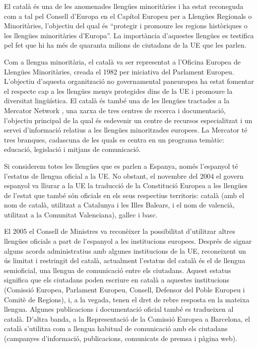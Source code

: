 \begin{multicols}{2}
El català és una de les anomenades llengües minoritàries i ha estat reconeguda com a tal pel Consell d’Europa en el Capítol Europeu per a Llengües Regionals o Minoritàries, l’objectiu del qual és “protegir i promoure les regions històriques o les llengües minoritàries d’Europa”. La importància d’aquestes llengües es testifica pel fet que hi ha més de quaranta milions de ciutadans de la UE que les parlen.

Com a llengua minoritària, el català va ser representat a l’Oficina Europea de Llengües Minoritàries, creada el 1982 per iniciativa del Parlament Europeu. L’objectiu d’aquesta organització no governamental paneuropea ha estat fomentar el respecte cap a les llengües menys protegides dins de la UE i promoure la diversitat lingüística. El català és també una de les llengües tractades a la Mercator Network \cite{CAT-Nota8}, una xarxa de tres centres de recerca i documentació, l’objectiu principal de la qual és esdevenir un centre de recursos especialitzat i un servei d’informació relatius a les llengües minoritzades europees. La Mercator té tres branques, cadascuna de les quals es centra en un programa temàtic: educació, legislació i mitjans de comunicació.  

Si considerem totes les llengües que es parlen a Espanya, només l’espanyol té l’estatus de llengua oficial a la UE. No obstant, el novembre del 2004 el govern espanyol va lliurar a la UE la traducció de la Constitució Europea a les llengües de l’estat que també són oficials en els seus respectius territoris: català (amb el nom de català, utilitzat a Catalunya i les Illes Balears, i el nom de valencià, utilitzat a la Comunitat Valenciana), gallec i basc.

El 2005 el Consell de Ministres va reconèixer la possibilitat d’utilitzar altres llengües oficials a part de l’espanyol a les institucions europees. Després de signar alguns acords administratius amb algunes institucions de la UE, reconeixent un ús limitat i restringit del català, actualment l’estatus del català és el de llengua semioficial, una llengua de comunicació entre els ciutadans. Aquest estatus significa que els ciutadans poden escriure en català a aquestes institucions (Comissió Europea, Parlament Europeu, Consell, Defensor del Poble Europeu i Comitè de Regions), i, a la vegada, tenen el dret de rebre resposta en la mateixa llengua. Algunes publicacions i documentació oficial també es tradueixen al català. D’altra banda, a la Representació de la Comissió Europea a Barcelona, el català s’utilitza com a llengua habitual de comunicació amb els ciutadans (campanyes d’informació, publicacions, comunicats de premsa i pàgina web). 


\end{multicols}
